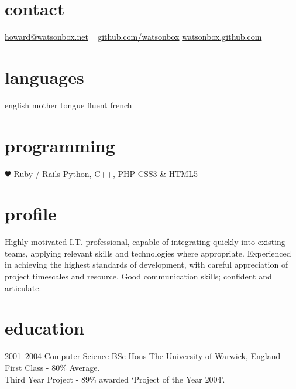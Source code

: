 \documentclass[]{friggeri-cv} %
\begin{document}


\begin{aside} %
\section{contact}
\href{mailto:howard@watsonbox.net}{howard@watsonbox.net}
~
\href{http://github.com/watsonbox}{github.com/watsonbox}
\href{http://watsonbox.github.com}{watsonbox.github.com}
\section{languages}
english mother tongue
fluent french
\section{programming}
{\color{red} $\varheartsuit$} Ruby / Rails
Python, C++, PHP
CSS3 \& HTML5
\end{aside}


\section{profile}

Highly motivated I.T. professional, capable of integrating quickly into existing teams, applying relevant skills and technologies where appropriate. Experienced in achieving the highest standards of development, with careful appreciation of project timescales and resource. Good communication skills; confident and articulate.

\section{education}

\begin{entrylist}
\entry
{2001--2004}
{Computer Science {\normalfont BSc Hons}}
{\href{http://www.warwick.ac.uk}{The University of Warwick, England}}
{First Class - 80\% Average.\\
Third Year Project - 89\% awarded `Project of the Year 2004'.}
\end{entrylist}
\end{document}
